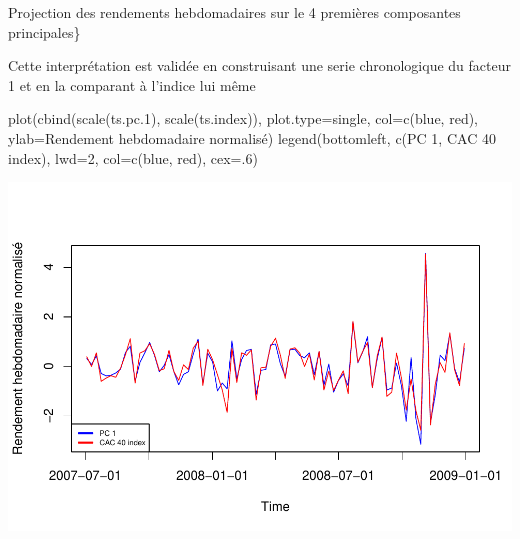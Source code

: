 \documentclass[
]{article}
\newenvironment{Shaded}{\begin{snugshade}}{\end{snugshade}}
\newcommand{\AttributeTok}[1]{\textcolor[rgb]{0.77,0.63,0.00}{#1}}
\newcommand{\DecValTok}[1]{\textcolor[rgb]{0.00,0.00,0.81}{#1}}
\newcommand{\FloatTok}[1]{\textcolor[rgb]{0.00,0.00,0.81}{#1}}
\newcommand{\FunctionTok}[1]{\textcolor[rgb]{0.00,0.00,0.00}{#1}}
\newcommand{\NormalTok}[1]{#1}
\newcommand{\OtherTok}[1]{\textcolor[rgb]{0.56,0.35,0.01}{#1}}
\newcommand{\SpecialCharTok}[1]{\textcolor[rgb]{0.00,0.00,0.00}{#1}}
\newcommand{\StringTok}[1]{\textcolor[rgb]{0.31,0.60,0.02}{#1}}
\begin{document}
Projection des rendements hebdomadaires sur le 4 premières composantes
principales\}

Cette interprétation est validée en construisant une serie chronologique
du facteur 1 et en la comparant à l'indice lui même

\begin{Shaded}
\end{Shaded}

\begin{Shaded}
\begin{Highlighting}[]
  \FunctionTok{plot}\NormalTok{(}\FunctionTok{cbind}\NormalTok{(}\FunctionTok{scale}\NormalTok{(ts.pc}\FloatTok{.1}\NormalTok{), }\FunctionTok{scale}\NormalTok{(ts.index)), }\AttributeTok{plot.type=}\StringTok{\textquotesingle{}single\textquotesingle{}}\NormalTok{,}
       \AttributeTok{col=}\FunctionTok{c}\NormalTok{(}\StringTok{\textquotesingle{}blue\textquotesingle{}}\NormalTok{, }\StringTok{\textquotesingle{}red\textquotesingle{}}\NormalTok{), }\AttributeTok{ylab=}\StringTok{\textquotesingle{}Rendement hebdomadaire normalisé\textquotesingle{}}\NormalTok{)}
  \FunctionTok{legend}\NormalTok{(}\StringTok{\textquotesingle{}bottomleft\textquotesingle{}}\NormalTok{, }\FunctionTok{c}\NormalTok{(}\StringTok{\textquotesingle{}PC 1\textquotesingle{}}\NormalTok{, }\StringTok{\textquotesingle{}CAC 40 index\textquotesingle{}}\NormalTok{), }\AttributeTok{lwd=}\DecValTok{2}\NormalTok{,}
         \AttributeTok{col=}\FunctionTok{c}\NormalTok{(}\StringTok{\textquotesingle{}blue\textquotesingle{}}\NormalTok{, }\StringTok{\textquotesingle{}red\textquotesingle{}}\NormalTok{), }\AttributeTok{cex=}\NormalTok{.}\DecValTok{6}\NormalTok{)}
\end{Highlighting}
\end{Shaded}

\includegraphics{TP1-Co_files/figure-latex/unnamed-chunk-6-1.pdf}
\end{document}
